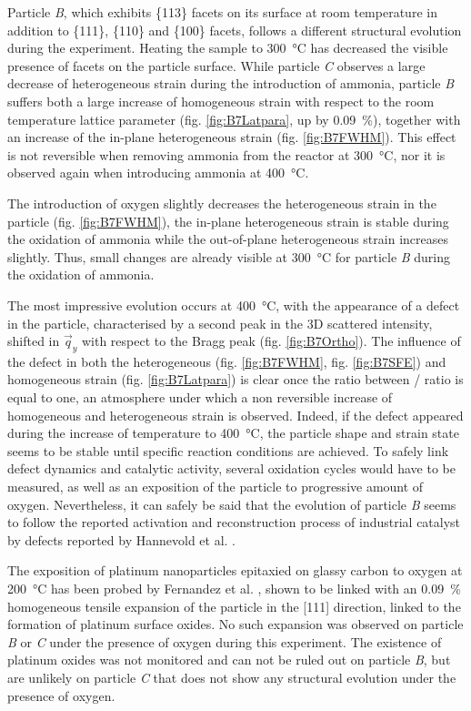 Particle \textit{B}, which exhibits \{113\} facets on its surface at room temperature in addition to \{111\}, \{110\} and \{100\} facets, follows a different structural evolution during the experiment.
Heating the sample to \qty{300}{\degreeCelsius} has decreased the visible presence of facets on the particle surface.
While particle \textit{C} observes a large decrease of heterogeneous strain during the introduction of ammonia, particle \textit{B} suffers both a large increase of homogeneous strain with respect to the room temperature lattice parameter (fig. \ref{fig:B7Latpara}, up by \qty{0.09}{\percent}), together with an increase of the in-plane heterogeneous strain (fig. \ref{fig:B7FWHM}).
This effect is not reversible when removing ammonia from the reactor at \qty{300}{\degreeCelsius}, nor it is observed again when introducing ammonia at \qty{400}{\degreeCelsius}.

The introduction of oxygen slightly decreases the heterogeneous strain in the particle (fig. \ref{fig:B7FWHM}), the in-plane heterogeneous strain is stable during the oxidation of ammonia while the out-of-plane heterogeneous strain increases slightly.
Thus, small changes are already visible at \qty{300}{\degreeCelsius} for particle \textit{B} during the oxidation of ammonia.

The most impressive evolution occurs at \qty{400}{\degreeCelsius}, with the appearance of a defect in the particle, characterised by a second peak in the 3D scattered intensity, shifted in $\vec{q}_y$ with respect to the Bragg peak (fig. \ref{fig:B7Ortho}).
The influence of the defect in both the heterogeneous (fig. \ref{fig:B7FWHM}, fig. \ref{fig:B7SFE}) and homogeneous strain (fig. \ref{fig:B7Latpara}) is clear once the ratio between / ratio is equal to one, an atmosphere under which a non reversible increase of homogeneous and heterogeneous strain is observed.
Indeed, if the defect appeared during the increase of temperature to \qty{400}{\degreeCelsius}, the particle shape and strain state seems to be stable until specific reaction conditions are achieved.
To safely link defect dynamics and catalytic activity, several oxidation cycles would have to be measured, as well as an exposition of the particle to progressive amount of oxygen.
Nevertheless, it can safely be said that the evolution of particle \textit{B} seems to follow the reported activation and reconstruction process of industrial catalyst by defects reported by Hannevold et al. \parencite{Hannevold2005}.

The exposition of platinum nanoparticles epitaxied on glassy carbon to oxygen at \qty{200}{\degreeCelsius} has been probed by Fernandez et al. \parencite*{Fernandez2019}, shown to be linked with an \qty{0.09}{\percent} homogeneous tensile expansion of the particle in the [111] direction, linked to the formation of platinum surface oxides.
No such expansion was observed on particle \textit{B} or \textit{C} under the presence of oxygen during this experiment.
The existence of platinum oxides was not monitored and can not be ruled out on particle \textit{B}, but are unlikely on particle \textit{C} that does not show any structural evolution under the presence of oxygen.


